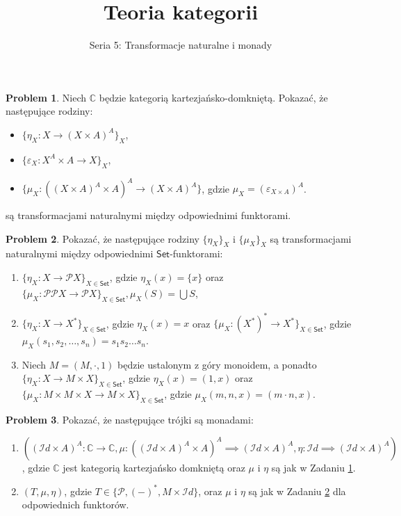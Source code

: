 \documentclass[10pt]{amsart}
\title{Teoria kategorii}
\author{Seria 5: Transformacje naturalne i monady}
\theoremstyle{plain}
\theoremstyle{definition}
\newtheorem{problem}{Problem}
\numberwithin{equation}{section}
\begin{document}
\maketitle

\begin{problem} \label{problem:1}
  Niech $\mathbb{C}$ będzie kategorią kartezjańsko-domkniętą. Pokazać, że następujące rodziny:
  \begin{itemize}
    \item $\{\eta_X: X\to (X\times A)^A\}_X$, 
    \item $\{\varepsilon_X: X^A\times A\to X\}_X$,
    \item $\{\mu_X: \left ( (X\times A)^A \times A\right )^A \to (X\times A)^A \}$, gdzie 
        $\mu_X =  (\varepsilon_{X\times A})^A$. 
  \end{itemize}
  są transformacjami naturalnymi między odpowiednimi funktorami. 
\end{problem} 

\begin{problem} \label{problem:2}
  Pokazać, że następujące rodziny $\{\eta_X\}_X$ i $\{\mu_X\}_X$ są 
transformacjami naturalnymi między odpowiednimi $\mathsf{Set}$-funktorami:
\begin{enumerate}
\item $\{\eta_X:X\to \mathcal{P}X\}_{X\in \mathsf{Set}}$, gdzie $\eta_X(x) = \{x\}$ oraz 
  $\{\mu_X: \mathcal{P}\mathcal{P}X\to \mathcal{P}X\}_{X\in \mathsf{Set}}, \mu_X(S) =\bigcup S$,
\item $\{\eta_X:X\to X^\ast\}_{X\in \mathsf{Set}}$, gdzie $\eta_X(x) = x$ 
  oraz $\{\mu_X: (X^\ast)^\ast \to X^\ast\}_{X\in \mathsf{Set}}$, 
  gdzie $\mu_X( s_1,s_2,\ldots, s_n ) = s_1s_2\ldots s_n$.
\item Niech  $M=(M,\cdot,1)$ będzie ustalonym z góry monoidem, a ponadto
  $\{\eta_X: X\to M\times X\}_{X\in \mathsf{Set}}$, gdzie $\eta_X(x) = (1,x)$ oraz  
  $\{\mu_{X}:M\times M\times X\to M\times X\}_{X\in \mathsf{Set}}$, 
  gdzie $\mu_{X}(m,n,x) = (m\cdot n,x)$.
\end{enumerate}
\end{problem}


\begin{problem} 
Pokazać, że następujące trójki są monadami:
\begin{enumerate}
  \item 
    $((\mathcal{I}d\times A)^A:\mathbb{C}\to \mathbb{C}, 
    \mu: \left ((\mathcal{I}d\times A)^A \times A\right)^A\implies (\mathcal{I}d\times A)^A, 
    \eta: \mathcal{I}d\implies (\mathcal{I}d\times A)^A)
    $, 
    gdzie $\mathbb{C}$ jest kategorią kartezjańsko domkniętą oraz $\mu$ i $\eta$ są jak w Zadaniu \ref{problem:1}.  
  \item $(T, \mu, \eta)$, gdzie $T\in \{\mathcal{P}, (-)^\ast, M\times \mathcal{I}d\}$, oraz 
      $\mu$ i $\eta$ są jak w Zadaniu \ref{problem:2} dla odpowiednich funktorów. 
   
\end{enumerate}
\end{problem}
\end{document}
